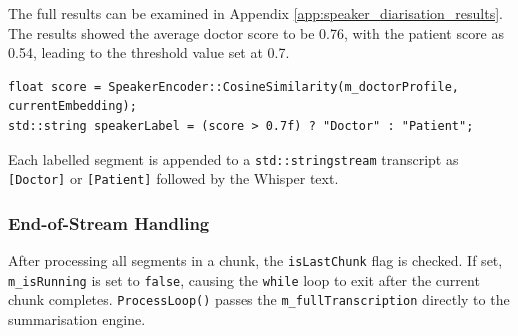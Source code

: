 
The full results can be examined in Appendix \ref{app:speaker_diarisation_results}.
The results showed the average doctor score to be 0.76, with the patient score as 0.54, leading to the threshold value set at 0.7.
\begin{verbatim}
float score = SpeakerEncoder::CosineSimilarity(m_doctorProfile, currentEmbedding);
std::string speakerLabel = (score > 0.7f) ? "Doctor" : "Patient";
\end{verbatim}

Each labelled segment is appended to a \texttt{std::stringstream} transcript as \texttt{[Doctor]} or \texttt{[Patient]} followed by the Whisper text.

\subsubsection{End-of-Stream Handling}
After processing all segments in a chunk, the \texttt{isLastChunk} flag is checked. If set, \texttt{m\_isRunning} is set to \texttt{false}, causing the \texttt{while} loop to exit after the current chunk completes. \texttt{ProcessLoop()} passes the \texttt{m\_fullTranscription} directly to the summarisation engine.